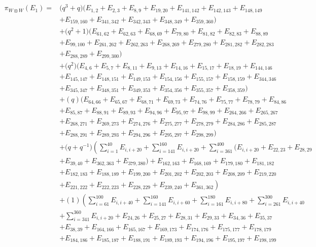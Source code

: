 \documentclass[pdftex]{sigma}
\numberwithin{equation}{section}
\theoremstyle{definition}
\begin{document}
\begin{align*}
 \pi_{W \otimes W}(E_1) ={} &\bigl(q^3+q\bigr)(E_{1,2}+E_{2,3}+E_{8,9}+E_{19,20}+E_{141,142}+E_{142,143}+E_{148,149}\\
 &+E_{159,160}+E_{341,342}+E_{342,343}+E_{348,349}+E_{359,360}) \\
 &+\bigl(q^2+1\bigr)(E_{61,62}+E_{62,63}+E_{68,69}+E_{79,80}+E_{81,82}+E_{82,83}+E_{88,89} \\
 &+E_{99,100}+E_{261,262}+E_{262,263}+E_{268,269}+E_{279,280}+E_{281,282}+E_{282,283} \\
 &+E_{288,289}+E_{299,300})\\
 &+\bigl(q^2\bigr)(E_{4,6}+E_{5,7}+E_{8,11}+E_{9,13}+E_{14,16}+E_{15,17}+E_{18,19}+E_{144,146}\\
 &+E_{145,147}+E_{148,151}+E_{149,153}+E_{154,156}+E_{155,157}+E_{158,159}+E_{344,346}\\
 &+E_{345,347}+E_{348,351}+E_{349,353}+E_{354,356}+E_{355,357}+E_{358,359})\\
 &+(q)(E_{64,66}+E_{65,67}+E_{68,71}+E_{69,73}+E_{74,76}+E_{75,77}+E_{78,79}+E_{84,86} \\
 &+E_{85,87}+E_{88,91}+E_{89,93}+E_{94,96}+E_{95,97}+E_{98,99}+E_{264,266}+E_{265,267}\\
 &+E_{268,271}+E_{269,273}+E_{274,276} +E_{275,277}+E_{278,279}+E_{284,286}+E_{285,287}\\
 &+E_{288,291}+E_{289,293}+E_{294,296}+E_{295,297}+E_{298,299}) \\
 &+\bigl(q+q^{-1}\bigr)\left( \sum_{i=1}^{40} E_{i,i+20} + \sum_{i=141}^{160} E_{i,i+20} +\sum_{i=361}^{400}\bigl(E_{i,i+20} + E_{22,23}+E_{28,29} \right. \\
 &+E_{39,40}+E_{362,363}+E_{379,380}\bigr)+E_{162,163}+E_{168,169}+E_{179,180}+E_{181,182}\\
 &+E_{182,183}+E_{188,189}+E_{199,200}+E_{201,202}+E_{202,203}+E_{208,209}+E_{219,220}\\
 &\left.+E_{221,222}+E_{222,223}+E_{228,229}+E_{239,240}+E_{361,362} \right) \\
 &+(1) \left( \sum_{i=61}^{100} E_{i,i+40} + \sum_{i=141}^{160} E_{i,i+60}+\sum_{i=161}^{180} E_{i,i+80} +\sum_{i=261}^{300} E_{i,i+40} \right. \\
 &+\sum_{i=341}^{360}E_{i,i+20}+E_{24,26}+E_{25,27}+E_{28,31}+E_{29,33}+E_{34,36}+E_{35,37}\\
 &+E_{38,39}+E_{164,166}+E_{165,167}+E_{169,173}+E_{174,176}+E_{175,177}+E_{178,179}\\
 &+E_{184,186}+E_{185,187}+E_{188,191}+E_{189,193}+E_{194,196}+E_{195,197}+E_{198,199}\\

\end{align*}
\end{document}
